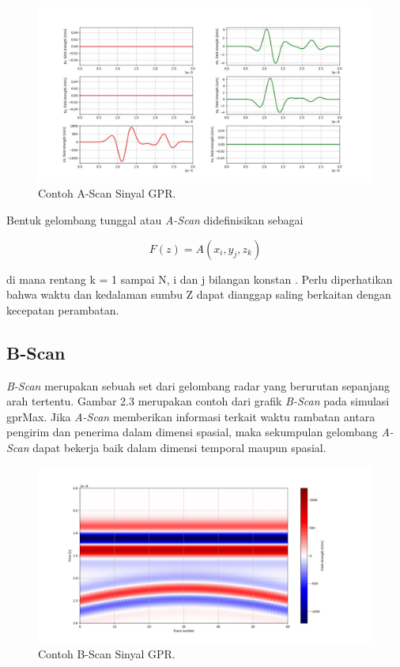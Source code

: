 \begin{figure}[ht]
  \centering
  \includegraphics[scale=0.35]{gambar/GPRAscan.jpeg}
  \caption{Contoh A-Scan Sinyal GPR.}
  \label{fig:AscanGPR}
\end{figure}

Bentuk gelombang tunggal atau \emph{A-Scan} didefinisikan sebagai

\begin{equation}
  \label{eq:Ascan}
  F(z)=A( x_{i} , y_{j} , z_{k} )
\end{equation}

di mana rentang k = 1 sampai N, i dan j bilangan konstan \parencite{danielDvd}.
Perlu diperhatikan bahwa waktu dan kedalaman sumbu Z dapat dianggap saling berkaitan dengan kecepatan perambatan.\\

\subsection{B-Scan}
\label{subsec:bScan}

\emph{B-Scan} merupakan sebuah set dari gelombang radar yang berurutan sepanjang arah tertentu. 
Gambar 2.3 merupakan contoh dari grafik \emph{B-Scan} pada simulasi gprMax. 
Jika \emph{A-Scan} memberikan informasi terkait waktu rambatan antara pengirim dan penerima dalam dimensi spasial, maka sekumpulan gelombang \emph{A-Scan} dapat bekerja baik dalam dimensi temporal maupun spasial.

\begin{figure}[ht]
  \centering
  \includegraphics[scale=0.35]{gambar/GPRBscan.jpg}
  \caption{Contoh B-Scan Sinyal GPR.}
  \label{fig:BscanGPR}
\end{figure}

